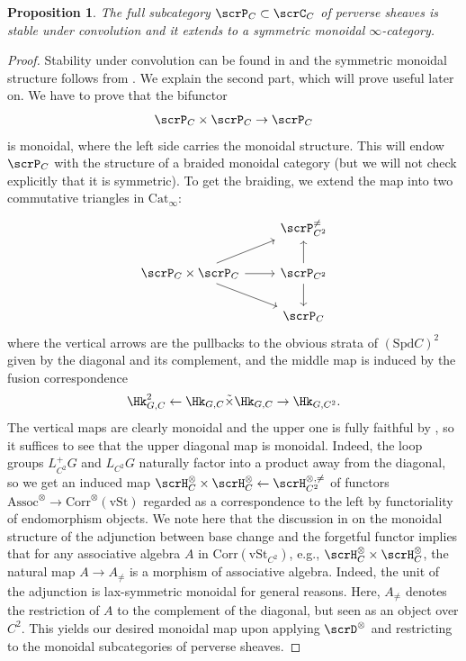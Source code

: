 \documentclass[10pt, reqno]{amsart}
\theoremstyle{plain}
\newtheorem{proposition}[theorem]{Proposition}
\theoremstyle{definition}
\numberwithin{equation}{section}
\begin{document}
	\begin{proposition}\label{prop_fusion}
		The full subcategory $\scrP_C \subset \scrC_C$ of perverse sheaves is stable under convolution and it extends to a symmetric monoidal $\infty$-category.
	\end{proposition}
	
	\begin{proof}
		Stability under convolution can be found in \cite[Proposition VI.8.1]{FS21} and the symmetric monoidal structure follows from \cite[Definition/Proposition VI.9.4]{FS21}. We explain the second part, which will prove useful later on. 
		We have to prove that the bifunctor
		\begin{equation}
			\scrP_C \times \scrP_C \to \scrP_C
		\end{equation}
		is monoidal, where the left side carries the monoidal structure. This will endow $\scrP_C$ with the structure of a braided monoidal category (but we will not check explicitly that it is symmetric). To get the braiding, we extend the map into two commutative triangles in $\mathrm{Cat}_\infty$:
		\begin{equation}\label{eqn_diagram_fusion}\begin{tikzcd}
				& \scrP_{C^2}^{\neq} \\
				\scrP_C \times \scrP_C& \scrP_{C^2}\\
				& \scrP_C
				\arrow[from=2-1, to=2-2]
				\arrow[from=2-1, to=1-2]
				\arrow[from=2-1, to=3-2]
				\arrow[from=2-2, to=1-2]
				\arrow[from=2-2, to=3-2]
			\end{tikzcd}
		\end{equation}
		where the vertical arrows are the pullbacks to the obvious strata of $(\mathrm{Spd}C)^2$ given by the diagonal and its complement, and the middle map is induced by the fusion correspondence
		\begin{equation}
			\Hk_{G,C}^2 \leftarrow \Hk_{G,C} \tilde{\times} \Hk_{G,C} \to \Hk_{G,C^2}.
		\end{equation} The vertical maps are clearly monoidal and the upper one is fully faithful by \cite[Proposition VI.9.3]{FS21}, so it suffices to see that the upper diagonal map is monoidal.
		Indeed, the loop groups $L_{C^2}^+G$ and $L_{C^2}G$ naturally factor into a product away from the diagonal, so we get an induced map $\scrH_C^\otimes \times \scrH_C^\otimes \leftarrow \scrH_{C^2}^{\otimes,\neq} $ of functors $\mathrm{Assoc}^\otimes \to \mathrm{Corr}^\otimes(\mathrm{vSt})$ regarded as a correspondence to the left by functoriality of endomorphism objects.
		We note here that the discussion in  on the monoidal structure of the adjunction between base change and the forgetful functor implies that for any associative algebra $A$ in $\mathrm{Corr}(\mathrm{vSt}_{C^2})$, e.g., $\scrH_C^\otimes \times \scrH_C^\otimes$, the natural map $A\to A_{\neq}$ is a morphism of associative algebra.
		Indeed, the unit of the adjunction is lax-symmetric monoidal for general reasons.
		Here, $A_{\neq}$ denotes the restriction of $A$ to the complement of the diagonal, but seen as an object over $C^2$.
		This yields our desired monoidal map upon applying $\scrD^\otimes$ and restricting to the monoidal subcategories of perverse sheaves.
	\end{proof}
	
\end{document}
